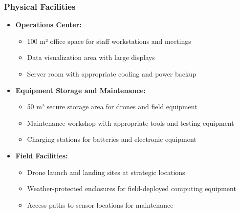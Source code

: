 \subsubsection{Physical Facilities}
\begin{itemize}
    \item \textbf{Operations Center:}
    \begin{itemize}
        \item 100 m² office space for staff workstations and meetings
        \item Data visualization area with large displays
        \item Server room with appropriate cooling and power backup
    \end{itemize}
    
    \item \textbf{Equipment Storage and Maintenance:}
    \begin{itemize}
        \item 50 m² secure storage area for drones and field equipment
        \item Maintenance workshop with appropriate tools and testing equipment
        \item Charging stations for batteries and electronic equipment
    \end{itemize}
    
    \item \textbf{Field Facilities:}
    \begin{itemize}
        \item Drone launch and landing sites at strategic locations
        \item Weather-protected enclosures for field-deployed computing equipment
        \item Access paths to sensor locations for maintenance
    \end{itemize}
\end{itemize}

